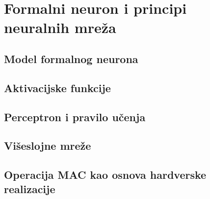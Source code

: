 \section{Formalni neuron i principi neuralnih mreža}

\subsection{Model formalnog neurona}

\subsection{Aktivacijske funkcije}

\subsection{Perceptron i pravilo učenja}

\subsection{Višeslojne mreže}

\subsection{Operacija MAC kao osnova hardverske realizacije}
